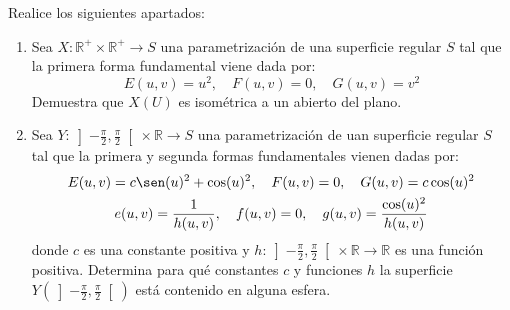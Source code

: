 \documentclass[12pt]{article}
\begin{document}
    \begin{ejercicio}
        Realice los siguientes apartados:
        \begin{enumerate}[label=\alph*)]
            \item Sea $X:\mathbb{R}^+\times\mathbb{R}^+\to S$ una parametrización de una superficie regular $S$ tal que la primera forma fundamental viene dada por:
                \begin{equation*}
                    E(u,v) = u^2, \quad F(u,v) =0,\quad G(u,v) = v^2
                \end{equation*}
                Demuestra que $X(U)$ es isométrica a un abierto del plano.
            \item Sea $Y:\left]-\frac{\pi}{2},\frac{\pi}{2}\right[\times \mathbb{R}\to S$ una parametrización de uan superficie regular $S$ tal que la primera y segunda formas fundamentales vienen dadas por:
                \begin{gather*}
                    E(u,v) = c\sen(u)^2 + \cos(u)^2, \quad F(u,v) = 0, \quad G(u,v) = c\cos(u)^2 \\
                    e(u,v) = \frac{1}{h(u,v)}, \quad f(u,v) = 0, \quad g(u,v) = \frac{\cos(u)^2}{h(u,v)}
                \end{gather*}
                donde $c$ es una constante positiva y $h:\left]-\frac{\pi}{2},\frac{\pi}{2}\right[\times\mathbb{R}\to\mathbb{R}$ es una función positiva. Determina para qué constantes $c$ y funciones $h$ la superficie $Y\left(\left]-\frac{\pi}{2},\frac{\pi}{2}\right[\right)$ está contenido en alguna esfera.
        \end{enumerate}
    \end{ejercicio}
\end{document}
